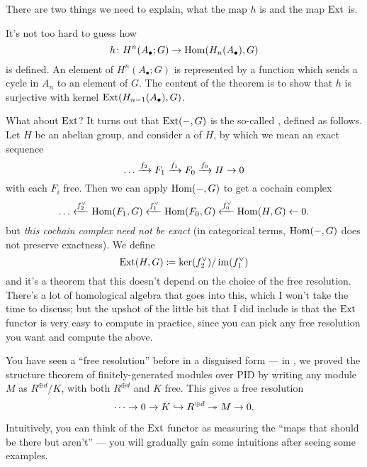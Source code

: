 There are two things we need to explain, what the map $h$ is and the map $\operatorname{Ext}$ is.

It's not too hard to guess how \[ h \colon H^n(A_\bullet; G) \to \operatorname{Hom}(H_n(A_\bullet), G) \] is defined.
An element of $H^n(A_\bullet;G)$ is represented by a function which sends a cycle
in $A_n$ to an element of $G$.
The content of the theorem is to show that $h$ is surjective with kernel $\operatorname{Ext}(H_{n-1}(A_\bullet), G)$.

What about $\operatorname{Ext}$?
It turns out that $\operatorname{Ext}(-,G)$ is the so-called , defined as follows.
Let $H$ be an abelian group, and consider a  of $H$,
by which we mean an exact sequence
\[ \dots \xrightarrow{f_2} F_1 \xrightarrow{f_1} F_0 \xrightarrow{f_0} H \to 0 \]
with each $F_i$ free.
Then we can apply $\operatorname{Hom}(-,G)$ to get a cochain complex
\[ \dots \xleftarrow{f_2^\vee} \operatorname{Hom}(F_1, G) \xleftarrow{f_1^\vee}
	\operatorname{Hom}(F_0, G) \xleftarrow{f_0^\vee} \operatorname{Hom}(H,G) \leftarrow 0. \]
but \emph{this cochain complex need not be exact}
(in categorical terms, $\operatorname{Hom}(-,G)$ does not preserve exactness).
We define \[ \operatorname{Ext}(H,G) \coloneqq \ker(f_2^\vee) / \operatorname{im}(f_1^\vee) \]
and it's a theorem that this doesn't depend on the choice of the free resolution.
There's a lot of homological algebra that goes into this,
which I won't take the time to discuss;
but the upshot of the little bit that I did include is that the $\operatorname{Ext}$
functor is very easy to compute in practice, since
you can pick any free resolution you want and compute the above.

\begin{remark}
	You have seen a ``free resolution'' before in a disguised form ---
	in , we proved the structure theorem of finitely-generated modules
	over PID by writing any module $M$ as $R^{\oplus d}/K$, with both $R^{\oplus d}$ and $K$ free.
	This gives a free resolution
	\[ \dots \to 0 \to K \hookrightarrow R^{\oplus d} \twoheadrightarrow M \to 0. \]

	Intuitively, you can think of the $\operatorname{Ext}$ functor as measuring the ``maps that should be there
	but aren't'' --- you will gradually gain some intuitions after seeing some
	examples.\footnotemark
\end{remark}


